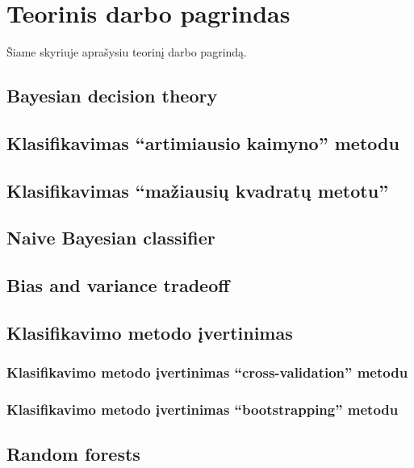 \documentclass{article}
\begin{document}
\let \savenumberline \numberline
\def \numberline#1{\savenumberline{#1.}}
\tableofcontents
\newpage

%

\section{Teorinis darbo pagrindas}
Šiame skyriuje aprašysiu teorinį darbo pagrindą. %


\subsection{Bayesian decision theory}
\subsection{Klasifikavimas ``artimiausio kaimyno'' metodu}
\subsection{Klasifikavimas ``mažiausių kvadratų metotu''}
\subsection{Naive Bayesian classifier}
\subsection{Bias and variance tradeoff}
\subsection{Klasifikavimo metodo įvertinimas}
\subsubsection{Klasifikavimo metodo įvertinimas ``cross-validation'' metodu}
\subsubsection{Klasifikavimo metodo įvertinimas ``bootstrapping'' metodu}

\subsection{Random forests}
\end{document}
